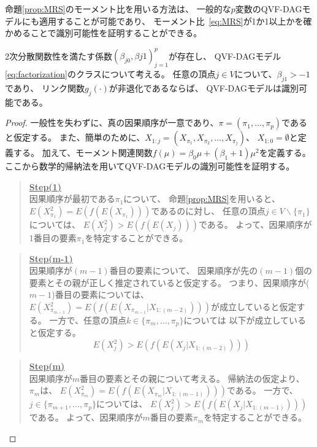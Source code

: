 命題\ref{prop:MRS}のモーメント比を用いる方法は、
一般的な$p$変数のQVF-DAGモデルにも適用することが可能であり、
モーメント比~\eqref{eq:MRS}が1か1以上かを確かめることで識別可能性を証明することができる。

\begin{theo}
  2次分散関数性を満たす係数$(\beta_{j0}, \beta{j1})_{j=1}^p$が存在し、
  QVF-DAGモデル\eqref{eq:factorization}のクラスについて考える。
  任意の頂点$j \in V$について、$\beta_{j1} > -1$であり、
  リンク関数$g_j(\cdot)$が非退化であるならば、
  QVF-DAGモデルは識別可能である。
\end{theo}

\begin{proof}
  一般性を失わずに、真の因果順序が一意であり、$\pi = (\pi_1, \dots, \pi_p)$であると仮定する。
  また、簡単のために、$X_{1:j} = (X_{\pi_1}, X_{\pi_2}, \dots, X_{\pi_j})$、
  $X_{1:0} = \emptyset$と定義する。
  加えて、モーメント関連関数$f(\mu) = \beta_0 \mu + (\beta_1 + 1)\mu^2$を定義する。
  ここから数学的帰納法を用いてQVF-DAGモデルの識別可能性を証明する。

  \begin{quote}
    \underline{\textbf{Step(1)}} \\
    因果順序が最初である$\pi_1$について、
    命題\ref{prop:MRS}を用いると、
    $E(X_{\pi_1}^2) = E(f(E(X_{\pi_1})))$であるのに対し、
    任意の頂点$j \in V \backslash \{ \pi_1 \}$については、
    $E(X_j ^2) > E(f(E(X_j)))$である。
    よって、因果順序が1番目の要素$\pi_1$を特定することができる。
  \end{quote}

  \begin{quote}
    \underline{\textbf{Step(m-1)}} \\
    因果順序が$(m-1)$番目の要素について、
    因果順序が先の$(m-1)$個の要素とその親が正しく推定されていると仮定する。
    つまり、因果順序が($m-1$)番目の要素については、
    $E(X_{\pi_{m-1}}^2) = E(f(E(X_{\pi_{m-1}} | X_{1:(m-2)})))$が成立していると仮定する。
    一方で、任意の頂点$k \in \{\pi_m, \dots, \pi_p \}$については
    以下が成立していると仮定する。
    \begin{equation*}
      E(X_j^2) > E(f(E(X_j | X_{1:(m-2)})))
    \end{equation*}
  \end{quote}

  \begin{quote}
    \underline{\textbf{Step(m)}} \\
    因果順序が$m$番目の要素とその親について考える。
    帰納法の仮定より、$\pi_m$は、
    $E(X_{\pi_m}^2) = E(f(E(X_{\pi_m} | X_{1:(m-1)})))$である。
    一方で、$j \in \{ \pi_{m+1}, \dots, \pi_p \}$については、
    $E(X_j^2) > E(f(E(X_j | X_{1:(m-1)})))$である。
    よって、因果順序が$m$番目の要素$\pi_m$を特定することができる。


\end{quote}
\end{proof}
